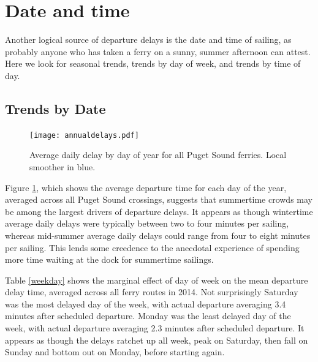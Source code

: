 \documentclass[11pt, letterpaper]{article}
\begin{document}
%


\section*{Date and time}

Another logical source of departure delays is the date and time of sailing, as probably anyone who has taken a ferry on a sunny, summer afternoon can attest. Here we look for seasonal trends, trends by day of week, and trends by time of day.

\subsection*{Trends by Date}

\begin{figure}[htbp]
\begin{center}
\texttt{[image: annualdelays.pdf]}
\caption{Average daily delay by day of year for all Puget Sound ferries. Local smoother in blue.}
\label{annual}
\end{center}
\end{figure}

Figure \ref{annual}, which shows the average departure time for each day of the year, averaged across all Puget Sound crossings, suggests that summertime crowds may be among the largest drivers of departure delays. It appears as though wintertime average daily delays were typically between two to four minutes per sailing, whereas mid-summer average daily delays could range from four to eight minutes per sailing. This lends some creedence to the anecdotal experience of spending more time waiting at the dock for summertime sailings.

Table \ref{weekday} shows the marginal effect of day of week on the mean departure delay time, averaged across all ferry routes in 2014. Not surprisingly Saturday was the most delayed day of the week, with actual departure averaging 3.4 minutes after scheduled departure. Monday was the least delayed day of the week, with actual departure averaging 2.3 minutes after scheduled departure. It appears as though the delays ratchet up all week, peak on Saturday, then fall on Sunday and bottom out on Monday, before starting again.
\end{document}
